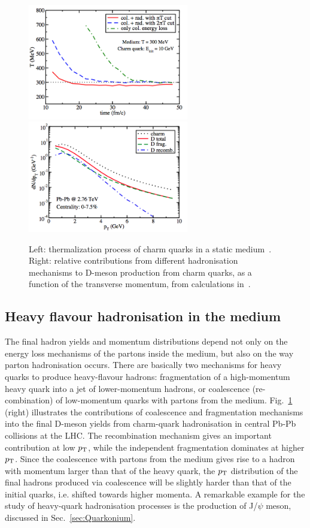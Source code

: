 \begin{figure}[!ht]
  \centering
  \includegraphics[width=7cm]{FigCap2/HFEnLoss3.png}
  \includegraphics[width=7cm]{FigCap2/FragHQ.png}
  \caption{Left: thermalization process of charm quarks in a static medium~\cite{Cao:2013ita}. Right: relative contributions from different hadronisation mechanisms to D-meson production  from charm quarks, as a function of the transverse momentum, from calculations in~\cite{Cao:2013ita}.}
  \label{fig:HFEnLoss2}
\end{figure}

\subsection{Heavy flavour hadronisation in the medium}
\label{sec:HFhadro}

The final hadron yields and momentum distributions depend not only on the energy loss 
mechanisms of the partons inside the medium,
but also on the way parton hadronisation occurs. There are basically 
two mechanisms for heavy quarks 
to produce heavy-flavour hadrons: fragmentation of a high-momentum 
heavy quark into a jet of lower-momentum
hadrons, or coalescence (re-combination) of low-momentum 
quarks with partons from the 
medium. Fig.~\ref{fig:HFEnLoss2} (right) illustrates the 
contributions of coalescence and fragmentation 
mechanisms into the final D-meson yields from charm-quark 
hadronisation in central Pb-Pb collisions at the LHC. The recombination mechanism
gives an important contribution at low $p_{\rm T}$, while the independent 
fragmentation dominates at higher $p_{\rm T}$.
Since the coalescence with partons from the medium gives rise to a 
hadron with momentum larger than that of the 
heavy quark, the $p_{\rm T}$ distribution of the final hadrons produced via coalescence will be slightly 
harder than that of the initial quarks,
i.e. shifted towards higher momenta. A remarkable example
for the study of heavy-quark hadronisation processes is the production of J/$\psi$ meson,
discussed in Sec.~\ref{sec:Quarkonium}.\\




